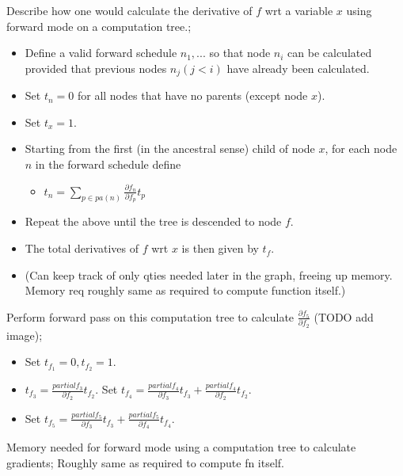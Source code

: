 \documentclass{article}
\begin{document}
Describe how one would calculate the derivative of $f$ wrt a variable $x$ using forward mode on a computation tree.; \begin{itemize} \item Define a valid forward schedule $n_1,...$ so that node $n_i$ can be calculated provided that previous nodes $n_j (j<i)$ have already been calculated.  \item Set $t_n=0$ for all nodes that have no parents (except node $x$).  \item Set $t_x = 1$.  \item Starting from the first (in the ancestral sense) child of node $x$, for each node $n$ in the forward schedule define \begin{itemize} \item $t_n = \sum_{p\in pa(n)}\frac{\partial f_n}{\partial f_p}t_p$ \end{itemize} \item Repeat the above until the tree is descended to node $f$.  \item The total derivatives of $f$ wrt $x$ is then given by $t_f$.  \item (Can keep track of only qties needed later in the graph, freeing up memory. Memory req roughly same as required to compute function itself.) \end{itemize}

Perform forward pass on this computation tree to calculate $\frac{\partial f_5}{\partial f_2}$ (TODO add image); \begin{itemize} \item Set $t_{f_1}=0, t_{f_2}=1$.  \item $t_{f_3} = \frac{partial f_3}{\partial f_2}t_{f_2}$. Set $t_{f_4} = \frac{partial f_4}{\partial f_3}t_{f_3} + \frac{partial f_4}{\partial f_2}t_{f_2}$.  \item Set $t_{f_5} = \frac{partial f_5}{\partial f_3}t_{f_3} + \frac{partial f_5}{\partial f_4}t_{f_4}$.  \end{itemize} 
            
Memory needed for forward mode using a computation tree to calculate gradients; Roughly same as required to compute fn itself.
\end{document}
